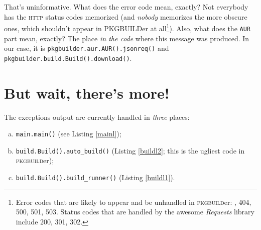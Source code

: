 \documentclass[a4paper,english]{book}
\numberwithin{equation}{section}
\newcommand{\pb}[0]{\textsc{pkgbuild}er}
\newcommand{\p}[1]{\nohyphens{\texttt{#1}}}
\begin{document}
That’s uninformative.  What does the error code mean, exactly?  Not everybody has the \textsc{http} status codes memorized (and \emph{nobody} memorizes the more obscure ones, which shouldn’t appear in PKGBUILDer at all\footnote{\label{fn:httpcodes}Error codes that are likely to appear and be unhandled in \pb: , 404, 500, 501, 503.  Status codes that are handled by the awesome \emph{Requests} library include 200, 301, 302.\rm}).  Also, what does the \texttt{AUR} part mean, exactly?  The place \emph{in the code} where this message was produced.  In our case, it is \p{pkgbuilder.aur.AUR().jsonreq()} and \p{pkgbuilder.build.Build().download()}.

\section{But wait, there’s more!}

The exceptions output are currently handled in \emph{three} places:
\begin{enumerate}[a)]
\item \p{main.main()} (see Listing \vref{mainl});
\item \p{build.Build().auto\_build()} (Listing \vref{buildl2}; this is the ugliest code in \pb);
\item \p{build.Build().build\_runner()} (Listing \vref{buildl1}).
\end{enumerate}
\end{document}
